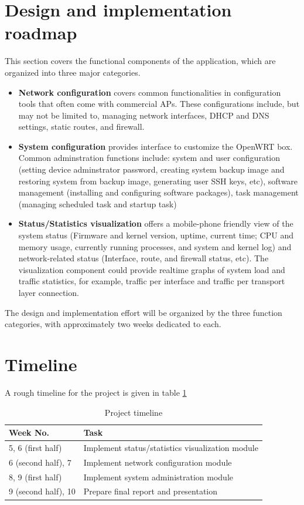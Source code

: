 \documentclass{sig-alternate-05-2015}
\begin{document}
\section{Design and implementation \\ roadmap}

This section covers the functional components of the application, which are organized into three major categories.

\begin{itemize}

\item
\textbf{Network configuration} covers common functionalities in configuration tools that often come with commercial APs. These configurations include, but may not be limited to, managing network interfaces, DHCP and DNS settings, static routes, and firewall.

\item
\textbf{System configuration} provides interface to customize the OpenWRT box. Common adminstration functions include: system and user configuration (setting device adminstrator password, creating system backup image and restoring system from backup image, generating user SSH keys, etc), software management (installing and configuring software packages), task management (managing scheduled task and startup task)

\item
\textbf{Status/Statistics visualization} offers a mobile-phone friendly view of the system status (Firmware and kernel version, uptime, current time; CPU and memory usage, currently running processes, and system and kernel log) and network-related status (Interface, route, and firewall status, etc). The visualization component could provide realtime graphs of system load and traffic statistics, for example, traffic per interface and traffic per transport layer connection.

\end{itemize}

The design and implementation effort will be organized by the three function categories, with approximately two weeks dedicated to each.

\section{Timeline}

A rough timeline for the project is given in table \ref{table:timeline}

\begin{table}[h]
\centering
\caption{Project timeline}
\label{table:timeline}
\begin{tabular}{p{3cm}|p{5cm}} \hline
Week No. & Task \\ \hline
5, 6 (first half) & Implement status/statistics visualization module \\ \hline
6 (second half), 7 & Implement network configuration module \\ \hline
8, 9 (first half) & Implement system administration module \\ \hline
9 (second half), 10 & Prepare final report and presentation \\
\hline\end{tabular}
\end{table}
\end{document}
